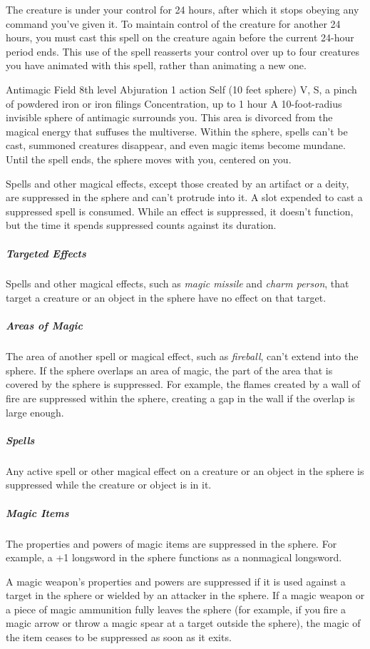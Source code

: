 \documentclass[10pt,a4paper,twoside,bg=print,twocolumn,openany,nodeprecatedcode]{dndbook}
\begin{document}
The creature is under your control for 24 hours, after which it stops obeying any command you've given it. To maintain control of the creature for another 24 hours, you must cast this spell on the creature again before the current 24-hour period ends. This use of the spell reasserts your control over up to four creatures you have animated with this spell, rather than animating a new one.



\DndSpellHeader%
{Antimagic Field}
{8th level Abjuration}
{1 action}
{Self (10 feet sphere)}
{V, S, a pinch of powdered iron or iron filings}
{Concentration, up to 1 hour}
A 10-foot-radius invisible sphere of antimagic surrounds you. This area is divorced from the magical energy that suffuses the multiverse. Within the sphere, spells can't be cast, summoned creatures disappear, and even magic items become mundane. Until the spell ends, the sphere moves with you, centered on you.

Spells and other magical effects, except those created by an artifact or a deity, are suppressed in the sphere and can't protrude into it. A slot expended to cast a suppressed spell is consumed. While an effect is suppressed, it doesn't function, but the time it spends suppressed counts against its duration.

\subparagraph{Targeted Effects}
Spells and other magical effects, such as \textit{magic missile} and \textit{charm person}, that target a creature or an object in the sphere have no effect on that target.

\subparagraph{Areas of Magic}
The area of another spell or magical effect, such as \textit{fireball}, can't extend into the sphere. If the sphere overlaps an area of magic, the part of the area that is covered by the sphere is suppressed. For example, the flames created by a wall of fire are suppressed within the sphere, creating a gap in the wall if the overlap is large enough.

\subparagraph{Spells}
Any active spell or other magical effect on a creature or an object in the sphere is suppressed while the creature or object is in it.

\subparagraph{Magic Items}
The properties and powers of magic items are suppressed in the sphere. For example, a +1 longsword in the sphere functions as a nonmagical longsword.

A magic weapon's properties and powers are suppressed if it is used against a target in the sphere or wielded by an attacker in the sphere. If a magic weapon or a piece of magic ammunition fully leaves the sphere (for example, if you fire a magic arrow or throw a magic spear at a target outside the sphere), the magic of the item ceases to be suppressed as soon as it exits.
\end{document}
